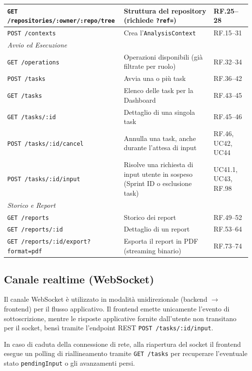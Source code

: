 \documentclass[11pt,a4paper]{article}
\begin{document}
\begin{table}[H]
\begin{tabularx}{\textwidth}{|X|X|l|}
\texttt{GET /repositories/\allowbreak{}:owner/\allowbreak{}:repo/tree} & Struttura del repository (richiede \texttt{?ref=}) & RF.25--28 \\ \hline
\texttt{POST /contexts} & Crea l'\texttt{AnalysisContext} & RF.15--31 \\ \hline
\multicolumn{3}{|l|}{\textit{Avvio ed Esecuzione}} \\ \hline
\texttt{GET /operations} & Operazioni disponibili (già filtrate per ruolo) & RF.32--34 \\ \hline
\texttt{POST /tasks} & Avvia una o più task & RF.36--42 \\ \hline
\texttt{GET /tasks} & Elenco delle task per la Dashboard & RF.43--45 \\ \hline
\texttt{GET /tasks/:id} & Dettaglio di una singola task & RF.45--46 \\ \hline
\texttt{POST /tasks/:id/cancel} & Annulla una task, anche durante l'attesa di input & RF.46, UC42, UC44 \\ \hline
\texttt{POST /tasks/:id/input} & Risolve una richiesta di input utente in sospeso (Sprint ID o esclusione task) & UC41.1, UC43, RF.98 \\ \hline
\multicolumn{3}{|l|}{\textit{Storico e Report}} \\ \hline
\texttt{GET /reports} & Storico dei report & RF.49--52 \\ \hline
\texttt{GET /reports/:id} & Dettaglio di un report & RF.53--64 \\ \hline
\texttt{GET /reports/:id/\linebreak[0]export?format=pdf} & Esporta il report in PDF (streaming binario) & RF.73--74 \\ \hline
\end{tabularx}
\end{table}

\subsection{Canale realtime (WebSocket)}

Il canale WebSocket è utilizzato in modalità unidirezionale (backend $\to$ frontend) per il flusso applicativo. Il frontend emette unicamente l'evento di sottoscrizione, mentre le risposte applicative fornite dall'utente non transitano per il socket, bensì tramite l'endpoint REST \texttt{POST /tasks/:id/input}.

In caso di caduta della connessione di rete, alla riapertura del socket il frontend esegue un polling di riallineamento tramite \texttt{GET /tasks} per recuperare l'eventuale stato \texttt{pendingInput} o gli avanzamenti persi.
\end{document}
